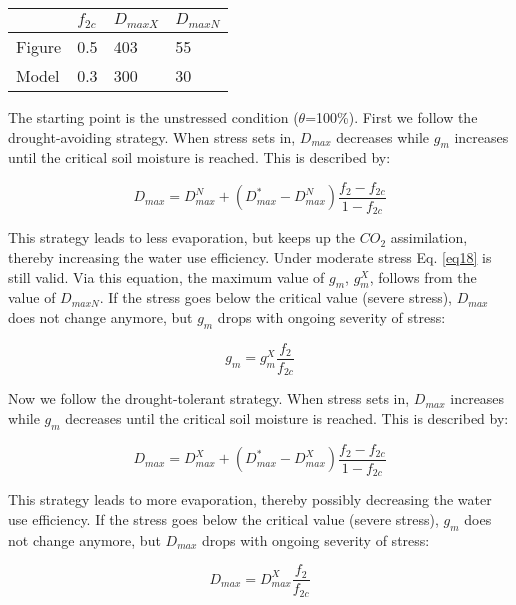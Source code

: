 {\begin{table}
			\begin{center}
			\begin{tabular}{llll}\label{tab14} \\
\hline
			 & $f_{2c}$  & $D_{maxX}$ & $D_{maxN}$ \\
\hline
Figure & 0.5  & 403  &  55     \\
Model  & 0.3  & 300  &  30     \\
\hline
			\end{tabular}
			\end{center}
\end{table}

The starting point is the unstressed condition ($\theta$=100\%). First we follow the drought-avoiding strategy.
When stress sets in, $D_{max}$ decreases while $g_{m}$ increases until the critical soil moisture is reached. This
is described by:

\begin{equation}
D_{max} = D_{max}^{N}+(D_{max}^{*}-D_{max}^{N})\frac{f_{2}-f_{2c}}{1-f_{2c}}
\end{equation}

This strategy leads to less evaporation, but keeps up the $CO_{2}$ assimilation, thereby increasing the
water use efficiency. Under moderate stress Eq. \ref{eq18} is still valid. Via this equation, the maximum value
of $g_{m}$, $g_{m}^{X}$, follows from the value of $D_{maxN}$. If the stress goes below the critical value (severe stress),
$D_{max}$ does not change anymore, but $g_{m}$ drops with ongoing severity of stress:

\begin{equation}
g_{m} = g_{m}^{X}\frac{f_{2}}{f_{2c}}
\end{equation}

Now we follow the drought-tolerant strategy. When stress sets in, $D_{max}$ increases while $g_{m}$ decreases
until the critical soil moisture is reached. This is described by:

\begin{equation}
D_{max} = D_{max}^{X}+(D_{max}^{*}-D_{max}^{X})\frac{f_{2}-f_{2c}}{1-f_{2c}}
\end{equation}


This strategy leads to more evaporation, thereby possibly decreasing the water use efficiency. If the
stress goes below the critical value (severe stress), $g_{m}$ does not change anymore, but $D_{max}$ drops with
ongoing severity of stress:

\begin{equation}
D_{max} = D_{max}^{X}\frac{f_{2}}{f_{2c}}
\end{equation}

}
